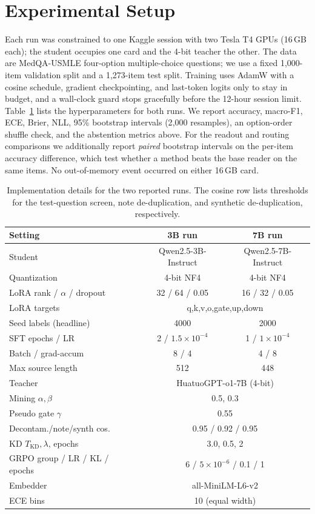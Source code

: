 \documentclass[conference]{IEEEtran}
\begin{document}
\section{Experimental Setup}
Each run was constrained to one Kaggle session with two Tesla T4 GPUs (16\,GB each); the student occupies one card and the 4-bit teacher the other. The data are MedQA-USMLE four-option multiple-choice questions; we use a fixed 1{,}000-item validation split and a 1{,}273-item test split. Training uses AdamW with a cosine schedule, gradient checkpointing, and last-token logits only to stay in budget, and a wall-clock guard stops gracefully before the 12-hour session limit. Table~\ref{tab:impl} lists the hyperparameters for both runs. We report accuracy, macro-F1, ECE, Brier, NLL, 95\% bootstrap intervals (2{,}000 resamples), an option-order shuffle check, and the abstention metrics above. For the readout and routing comparisons we additionally report \emph{paired} bootstrap intervals on the per-item accuracy difference, which test whether a method beats the base reader on the same items. No out-of-memory event occurred on either 16\,GB card.

\begin{table}[tb]
\caption{Implementation details for the two reported runs. The cosine row lists thresholds for the test-question screen, note de-duplication, and synthetic de-duplication, respectively.}
\label{tab:impl}
\centering
\footnotesize
\setlength{\tabcolsep}{4pt}
\begin{tabular}{@{}lcc@{}}
\toprule
Setting & 3B run & 7B run \\
\midrule
Student & Qwen2.5-3B-Instruct & Qwen2.5-7B-Instruct \\
Quantization & 4-bit NF4 & 4-bit NF4 \\
LoRA rank / $\alpha$ / dropout & 32 / 64 / 0.05 & 16 / 32 / 0.05 \\
LoRA targets & \multicolumn{2}{c}{q,k,v,o,gate,up,down} \\
Seed labels (headline) & 4000 & 2000 \\
SFT epochs / LR & 2 / $1.5\!\times\!10^{-4}$ & 1 / $1\!\times\!10^{-4}$ \\
Batch / grad-accum & 8 / 4 & 4 / 8 \\
Max source length & 512 & 448 \\
Teacher & \multicolumn{2}{c}{HuatuoGPT-o1-7B (4-bit)} \\
Mining $\alpha,\beta$ & \multicolumn{2}{c}{0.5, 0.3} \\
Pseudo gate $\gamma$ & \multicolumn{2}{c}{0.55} \\
Decontam./note/synth cos. & \multicolumn{2}{c}{0.95 / 0.92 / 0.95} \\
KD $T_{\text{KD}},\lambda$, epochs & \multicolumn{2}{c}{3.0, 0.5, 2} \\
GRPO group / LR / KL / epochs & \multicolumn{2}{c}{6 / $5\!\times\!10^{-6}$ / 0.1 / 1} \\
Embedder & \multicolumn{2}{c}{all-MiniLM-L6-v2} \\
ECE bins & \multicolumn{2}{c}{10 (equal width)} \\
\bottomrule
\end{tabular}
\end{table}
\end{document}
